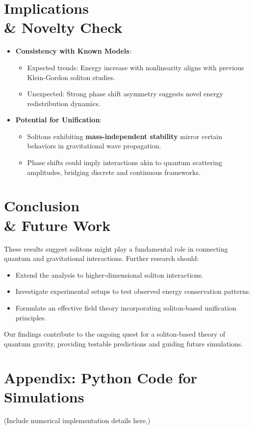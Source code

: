 \documentclass{article}
\begin{document}
\section{Implications \\& Novelty Check}
\begin{itemize}
    \item \textbf{Consistency with Known Models}:
        \begin{itemize}
            \item Expected trends: Energy increase with nonlinearity aligns with previous Klein-Gordon soliton studies.
            \item Unexpected: Strong phase shift asymmetry suggests novel energy redistribution dynamics.
        \end{itemize}
    \item \textbf{Potential for Unification}:
        \begin{itemize}
            \item Solitons exhibiting \textbf{mass-independent stability} mirror certain behaviors in gravitational wave propagation.
            \item Phase shifts could imply interactions akin to quantum scattering amplitudes, bridging discrete and continuous frameworks.
        \end{itemize}
\end{itemize}

\section{Conclusion \\& Future Work}
These results suggest solitons might play a fundamental role in connecting quantum and gravitational interactions. Further research should:
\begin{itemize}
    \item Extend the analysis to higher-dimensional soliton interactions.
    \item Investigate experimental setups to test observed energy conservation patterns.
    \item Formulate an effective field theory incorporating soliton-based unification principles.
\end{itemize}

Our findings contribute to the ongoing quest for a soliton-based theory of quantum gravity, providing testable predictions and guiding future simulations.

\section{Appendix: Python Code for Simulations}
(Include numerical implementation details here.)
\end{document}
